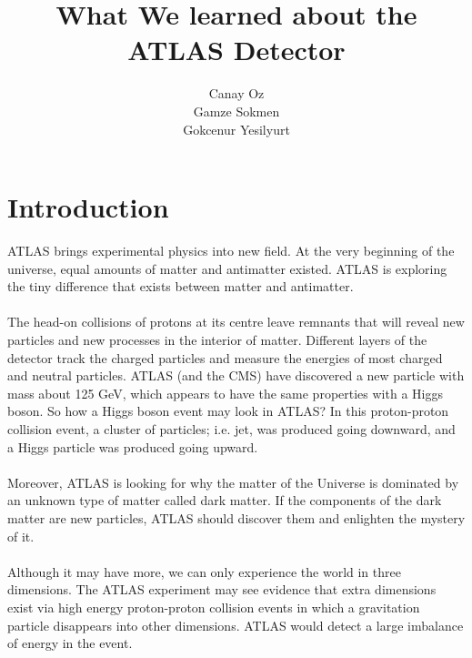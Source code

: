 \documentclass[a4paper,9pt]{article}
\title{ What We learned about the ATLAS Detector}
\author{Canay Oz \\ Gamze Sokmen \\ Gokcenur Yesilyurt}
\begin{document}
 
\maketitle
 
\section{Introduction}
ATLAS brings experimental physics into new field. At the very beginning of the universe, equal amounts of matter and antimatter existed.
ATLAS is exploring the tiny difference that exists between matter and antimatter. 
\\\\
The head-on collisions of protons at its centre leave remnants that will reveal new particles and new processes in the interior of matter.
Different layers of the detector track the charged particles and measure the energies of most charged and neutral particles. 
ATLAS (and the CMS) have discovered a new particle with mass about 125 GeV, which appears to have the same properties with a Higgs boson.
So how a Higgs boson event may look in ATLAS? In this proton-proton collision event, a cluster of particles; i.e. jet, was
produced going downward, and a Higgs particle was produced going upward. 
\\\\
Moreover, ATLAS is looking for why the matter of the Universe is dominated by an unknown type of matter called dark matter.
If the components of the dark matter are new particles, ATLAS should discover them and enlighten the mystery of it. 
\\\\
Although it may have more, we can only experience the world in three dimensions.
The ATLAS experiment may see evidence that extra dimensions exist via high energy proton-proton collision events in which a gravitation
particle disappears into other dimensions. ATLAS would detect a large imbalance of energy in the event. 
\end{document}
